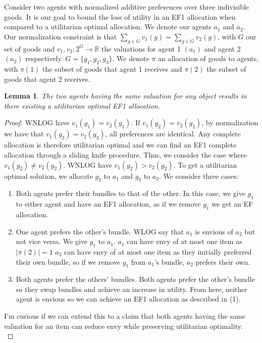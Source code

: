 \documentclass[12pt,letterpaper]{article}
\newtheorem{lemma}[theorem]{Lemma}
\theoremstyle{remark}
\theoremstyle{definition}
\begin{document}
Consider two agents with normalized additive preferences over three indivisible goods.  It is our goal to bound the loss of utility in an EF1 allocation when compared to a utilitarian optimal allocation.  
We denote our agents $a_1$ and $a_2$.  Our normalization constraint is that $\sum_{g\in G} v_1(g) = \sum_{g\in G} v_2(g)$, with $G$ our set of goods and $v_1, v_2 : 2^G \rightarrow \mathbb{R}$ the valuations for agent 1 $(a_1)$ and agent 2 $(a_2)$ respectively.  $G = \{g_1, g_2, g_3 \}$.  We denote $\pi$ an allocation of goods to agents, with $\pi(1)$ the subset of goods that agent 1 receives and $\pi(2)$ the subset of goods that agent 2 receives.  


\begin{lemma}
The two agents having the same valuation for any object results in there existing a utilitarian optimal EF1 allocation.  
\end{lemma}
\begin{proof}
WNLOG have $v_1(g_1) = v_2(g_1)$.  If $v_1(g_2) = v_2(g_2)$, by normalization we have that $v_1(g_3) = v_2(g_3)$, all preferences are identical.  Any complete allocation is therefore utilitarian optimal and we can find an EF1 complete allocation through a sliding knife procedure.  Thus, we consider the case where $v_1(g_2) \neq v_2(g_2)$.  WNLOG have $v_1(g_2) > v_2(g_2)$.  To get a utilitarian optimal solution, we allocate $g_2$ to $a_1$ and $g_3$ to $a_2$.  
We consider three cases:
\begin{enumerate}
    \item Both agents prefer their bundles to that of the other.  In this case, we give $g_1$ to either agent and have an EF1 allocation, as if we remove $g_1$ we get an EF allocation.  
    \item One agent prefers the other's bundle.  WLOG say that $a_1$ is envious of $a_2$ but not vice versa.  We give $g_1$ to $a_1$.  $a_1$ can have envy of at most one item as $|\pi(2)| = 1$  $a_2$ can have envy of at most one item as they initially preferred their own bundle, so if we remove $g_1$ from $a_1$'s bundle, $a_2$ prefers their own.    
    \item Both agents prefer the others' bundles.  Both agents prefer the other's bundle so they swap bundles and achieve an increase in utility.  From here, neither agent is envious so we can achieve an EF1 allocation as described in (1).  
\end{enumerate}

I'm curious if we can extend this to a claim that both agents having the same valuation for an item can reduce envy while preserving utilitarian optimality. \\
\end{proof}
\end{document}
